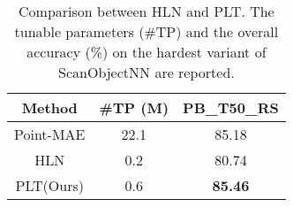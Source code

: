 \begin{table}[!t]
\scriptsize
\setlength{\tabcolsep}{7.8mm}
\centering
\caption{Comparison between HLN and PLT. The tunable parameters (\#TP) and the overall accuracy (\%) on the hardest variant of ScanObjectNN are reported. }
\vspace{-10pt}
\label{tab:sidenet}

\begin{tabular}{ccc}
\toprule
Method & \#TP (M) & PB\_T50\_RS \\
\midrule
Point-MAE & 22.1 & 85.18 \\
HLN & 0.2 & 80.74 \\
\rowcolor{linecolor!40} PLT(Ours) & 0.6 & \textbf{85.46} \\
\bottomrule
\end{tabular}
\vspace{-10pt}
\end{table}
